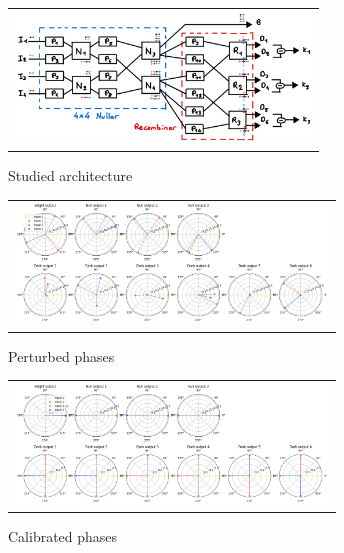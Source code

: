\documentclass{aa}
\begin{document}
    \begin{figure}[H]
        \begin{center}
        \begin{tabular}{c}
        \includegraphics[height=3.5cm]{img/scheme.png}
        \end{tabular}
        \end{center}
        \caption[architecture] 
        { \label{fig:architecture} 
        Studied architecture}
    \end{figure}

    \begin{figure}[H]
        \begin{center}
        \begin{tabular}{c}
        \includegraphics[height=3.2cm]{img/perturbed_phases.png}
        \end{tabular}
        \end{center}
        \caption[perturbed_phases] 
        { \label{fig:perturbed_phases} 
        Perturbed phases}
    \end{figure}

    \begin{figure}[H]
        \begin{center}
        \begin{tabular}{c}
        \includegraphics[height=3.2cm]{img/calibrated_phases.png}
        \end{tabular}
        \end{center}
        \caption[calibrated_phases] 
        { \label{fig:calibrated_phases} 
        Calibrated phases}
    \end{figure}
\end{document}
